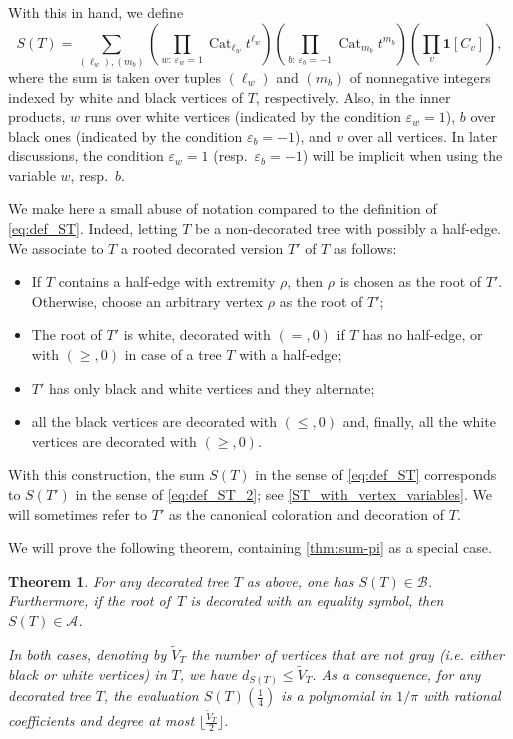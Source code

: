 \documentclass[12pt]{amsart}
\newcommand{\revision}[1]{{#1}}
\theoremstyle{plain}
\newtheorem{theorem}[lemma]{Theorem}
\theoremstyle{remark}
\def\eps{\varepsilon}
\def\One{\bm{1}}
\DeclareMathOperator{\Cat}{Cat}
\def\cA{\mathcal{A}}
\def\cB{\mathcal{B}}
\begin{document}
With this in hand, we define
\begin{equation}
\label{eq:def_ST_2}
S ( T ) = \sum_{(\ell_w), (m_b)}\left( \prod_{w: \, \eps_w=1} \Cat_{\ell_w} t^{\ell_w} \right) 
\left( \prod_{b: \, \eps_b=-1} \Cat_{m_b} t^{m_b} \right) \left( \prod_v \One[C_v] \right),
\end{equation}
 where the sum is taken over tuples $(\ell_w)$ and $(m_b)$ of nonnegative integers indexed by white and black vertices of $T$, respectively.
 Also, in the inner products, $w$ runs over white vertices (indicated by the condition $\eps_w=1$), 
 $b$ over black ones (indicated by the condition $\eps_b=-1$), and $v$ over all vertices.
In later discussions, the condition $\eps_w=1$ (resp.~$\eps_b=-1$) will be implicit when using the variable $w$, resp.~$b$.

We make here a small abuse of notation compared to the definition of \eqref{eq:def_ST}. Indeed, letting $T$ be a non-decorated tree with possibly a half-edge.
\revision{We associate to $T$ a rooted decorated version $T'$ of $T$ as follows:}
\begin{itemize}
\item \revision{If $T$ contains a half-edge with extremity $\rho$, then $\rho$ is chosen as the root of $T'$. Otherwise, choose an arbitrary vertex $\rho$ as the root of $T'$; }
\item \revision{The root of $T'$ is white, decorated with $(=, 0)$ if $T$ has no half-edge, 
or with $(\ge,0)$ in case of a tree $T$ with a half-edge;}
\item \revision{$T'$ has only black and white vertices and they alternate;}
\item \revision{all the black vertices are decorated with $(\le, 0)$ and, 
finally, all the white vertices are decorated with $(\ge, 0)$.}
\end{itemize}
With this construction, the sum $S(T)$ in the sense of  \eqref{eq:def_ST} corresponds to  $S(T')$  in the sense of \eqref{eq:def_ST_2}; see \cref{ST_with_vertex_variables}.
 We will sometimes refer to $T'$ as the canonical coloration and decoration of $T$.


We will prove the following theorem, 
containing \cref{thm:sum-pi} as a special case.
 \begin{theorem}\label{thm:sum-pi-generalized}
   For any decorated tree $T$ as above, one has $S ( T ) \in \cB$. 
   Furthermore, if the root of~$T$ is decorated with an equality symbol,
   then $S ( T ) \in \cA$.

   In both cases, denoting by $\tilde{V}_T$ the number of vertices that are not gray (i.e. either black or white vertices) in $T$, we have $d_{S(T)} \le \tilde{V}_T$.
   As a consequence, for any decorated tree $T$, the evaluation 
   $S ( T )(\frac{1}{4})$ is a polynomial in $1/\pi$
   with rational coefficients and degree at most $\lfloor \frac{\tilde{V}_T}{2} \rfloor$.  
 \end{theorem}
\end{document}
